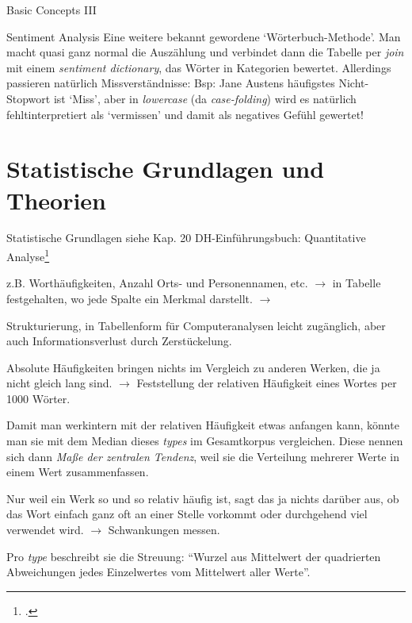 \documentclass[10pt,a4paper]{article}
\begin{document}
\begin{multicols}{3}
\begin{textbox}{Basic Concepts III}
\end{textbox}

\begin{textbox}{Sentiment Analysis}
Eine weitere bekannt gewordene `Wörterbuch-Methode'. Man macht quasi ganz normal die Auszählung und verbindet dann die Tabelle per \emph{join} mit einem \emph{sentiment dictionary}, das Wörter in Kategorien bewertet. Allerdings passieren natürlich Missverständnisse: Bsp: Jane Austens häufigstes Nicht-Stopwort ist `Miss', aber in \emph{lowercase} (da \emph{case-folding}) wird es natürlich fehltinterpretiert als `vermissen' und damit als negatives Gefühl gewertet!
\end{textbox}



\section{Statistische Grundlagen und Theorien}
\begin{textbox}{Statistische Grundlagen}
siehe Kap. 20 DH-Einführungsbuch: Quantitative Analyse\footcite[vgl.][]{DHIntroQA}

 z.B. Worthäufigkeiten, Anzahl Orts- und Personennamen, etc. $\to$ in Tabelle festgehalten, wo jede Spalte ein Merkmal darstellt. $\to$

 Strukturierung, in Tabellenform für Computeranalysen leicht zugänglich, aber auch Informationsverlust durch Zerstückelung.

Absolute Häufigkeiten bringen nichts im Vergleich zu anderen Werken, die ja nicht gleich lang sind. $\to$ Feststellung der relativen Häufigkeit eines Wortes per 1000 Wörter. 

Damit man werkintern mit der relativen Häufigkeit etwas anfangen kann, könnte man sie mit dem Median dieses \emph{types} im Gesamtkorpus vergleichen.
Diese nennen sich dann \emph{Maße der zentralen Tendenz}, weil sie die Verteilung mehrerer Werte in einem Wert zusammenfassen. 

Nur weil ein Werk so und so relativ häufig ist, sagt das ja nichts darüber aus, ob das Wort einfach ganz oft an einer Stelle vorkommt oder durchgehend viel verwendet wird. $\to$ Schwankungen messen. 

Pro \emph{type} beschreibt sie die Streuung: ``Wurzel aus Mittelwert der quadrierten Abweichungen jedes Einzelwertes vom Mittelwert aller Werte''.


\end{textbox}
\end{multicols}
\end{document}
